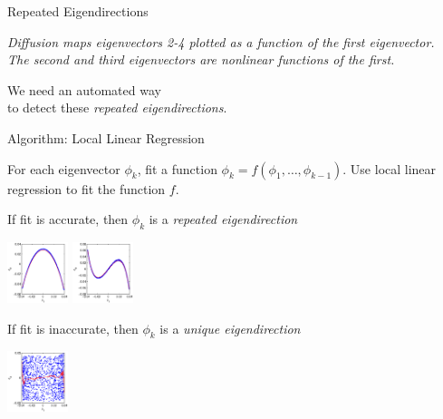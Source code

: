 \documentclass[12pt]{beamer}
\begin{document}
\begin{frame}{Repeated Eigendirections}
{\em \scriptsize Diffusion maps eigenvectors 2-4 plotted as a function of the first eigenvector. \\ The second and third eigenvectors are nonlinear functions of the first. \par}

\vspace{0.1in}

We need an automated way \\ to detect these {\em repeated eigendirections}.

\end{frame}

\begin{frame}{Algorithm: Local Linear Regression}

For each eigenvector $\phi_k$, fit a function $\phi_k = f(\phi_1, \dots, \phi_{k-1})$.
%
 Use local linear regression to fit the function $f$.

\vspace{0.1in}

\begin{minipage}{0.45\textwidth}
\centering
{\small If fit is accurate, then $\phi_k$ is a {\em repeated eigendirection} \par}

\includegraphics[width=0.7in]{strip_corr_12_fitline}
\includegraphics[width=0.7in]{strip_corr_13_fitline}
\end{minipage}
%
\hfill
%
\begin{minipage}{0.45\textwidth}
\centering
{\small If fit is inaccurate, then $\phi_k$ is a {\em unique eigendirection} \par}

\includegraphics[width=0.7in]{strip_corr_14_fitline}
\end{minipage}

\vspace{0.1in}


\end{frame}
\end{document}
